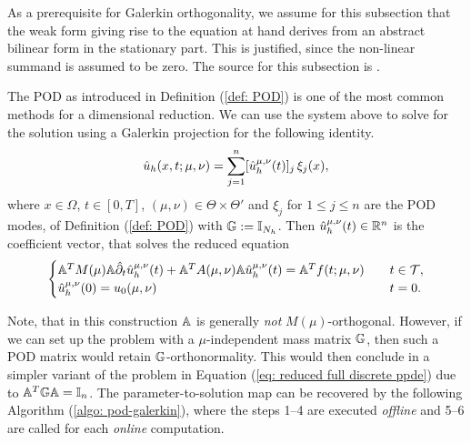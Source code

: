 As a prerequisite for Galerkin orthogonality, we assume for this subsection that the weak form 
giving rise to the equation at hand derives
from an abstract bilinear form in the stationary part. This is justified, since the non-linear summand is assumed to be zero. 
The source for this subsection is \cite[p. 137]{quarteroni2015rb}.

The POD as introduced in Definition (\ref{def: POD}) is one of the most common methods for a dimensional reduction. 
We can use the system above to solve for the solution using a Galerkin projection for the following
identity.
\begin{equation} \label{eq: identity for pod galerkin}
    \hat{u}_h(x, t; \mu, \nu) = \sum_{j=1}^n [\hat{u}_h^{\mu, \nu}(t)]_j \, \xi_j(x),
\end{equation}
where $x \in \Omega$, $t \in [0, T]$, $(\mu, \nu) \in \Theta \times \Theta'$ and 
$\xi_j$ for $1 \leq j \leq n$ are the POD modes, of Definition 
(\ref{def: POD}) with $\mathbb{G} := \mathbb{I}_{N_h}$. Then $\hat{u}_h^{\mu, \nu}(t) \in \mathbb{R}^n$
is the coefficient vector, that solves the reduced equation
\begin{equation} \label{eq: reduced full discrete ppde}
    \begin{cases}
        \mathbb{A}^T M(\mu) \mathbb{A} \hat{\partial}_t \hat{u}_h^{\mu, \nu}(t) + \mathbb{A}^T A(\mu, \nu) \mathbb{A} \hat{u}_h^{\mu, \nu}(t)
        = \mathbb{A}^T f(t; \mu, \nu) \quad &t \in \mathcal{T}, \\
        \hat{u}_h^{\mu, \nu}(0) = u_0(\mu, \nu) \quad &t = 0.
    \end{cases}
\end{equation}

Note, that in this construction $\mathbb{A}$ is generally \emph{not} $M(\mu)$-orthogonal. However, if we can set up the
problem with a $\mu$-independent mass matrix $\mathbb{G}$, then such a POD matrix would retain $\mathbb{G}$-orthonormality. This would then
conclude in a simpler variant of the problem in Equation (\ref{eq: reduced full discrete ppde}) due to $\mathbb{A}^T \mathbb{G} \mathbb{A} = \mathbb{I}_n$.
The parameter-to-solution map can be recovered by the following Algorithm (\ref{algo: pod-galerkin}), where the steps
1--4 are executed \emph{offline} and 5--6 are called for each \emph{online} computation.

